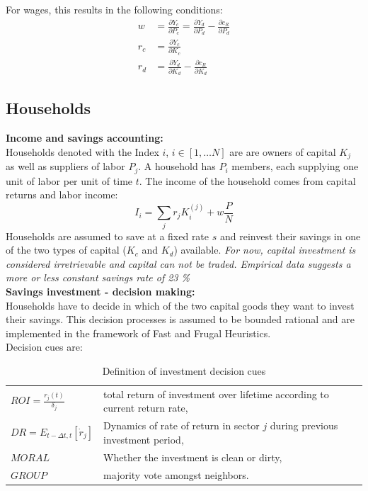 For wages, this results in the following conditions:
\begin{align}
	w &= \frac{\partial Y_c}{ \partial P_c} = \frac{\partial Y_d}{\partial P_d} - \frac{\partial c_R}{\partial P_d} \\
	r_c &= \frac{\partial Y_c}{\partial K_c} \\
	r_d &= \frac{\partial Y_d}{\partial K_d} - \frac{\partial c_R}{\partial K_d}
	\label{wage_and_rent_conditions}
\end{align}

\subsection{Households}

\textbf{Income and savings accounting:} \\
Households denoted with the Index $i$, $i \in [1, \dots N]$ are are owners of capital $K_j$ as well as suppliers of labor $P_j$. A household has $P_i$ members, each supplying one unit of labor per unit of time $t$. The income of the household comes from capital returns and labor income:
\begin{equation}
	I_i = \sum_j r_j K^{(j)}_{i} + w\frac{P}{N}
	\label{eq:household_income}
\end{equation}
Households are assumed to save at a fixed rate $s$ and reinvest their savings in one of the two types of capital ($K_c$ and $K_d$) available.
\textit{ For now, capital investment is considered irretrievable and capital can not be traded. Empirical data suggests a more or less constant savings rate of 23 \%} \\

\textbf{Savings investment - decision making:} \\
Households have to decide in which of the two capital goods they want to invest their savings. This decision processes is assumed to be bounded rational and are implemented in the framework of Fast and Frugal Heuristics.\\
Decision cues are:
\begin{table}[H]
	\centering
	\begin{tabular}{ll}
		$ROI = \frac{r_j(t)}{\delta_j}$ & total return of investment over lifetime according to current return rate,\\
		$DR = E_{t-\Delta t, t}[\dot{r}_j]$ & Dynamics of rate of return in sector $j$ during previous investment period, \\
		$MORAL$ & Whether the investment is clean or dirty, \\
		$GROUP$ & majority vote amongst neighbors. \\
	\end{tabular}
	\caption{Definition of investment decision cues}
	\label{tab:decision_cues}
\end{table}

